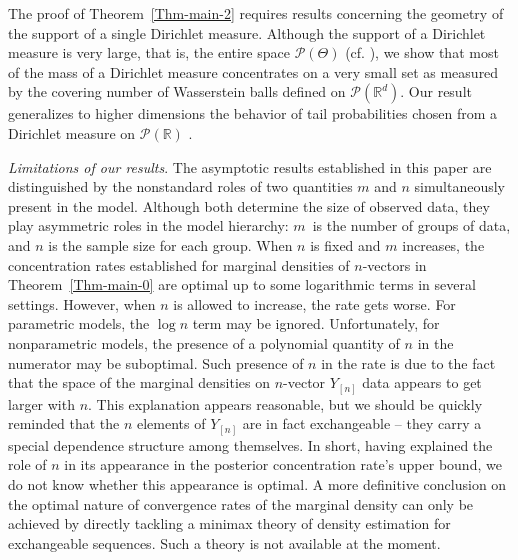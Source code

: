 \documentclass[MSNbibl,number,citesort]{arxbj}
\newcommand{\real}{\mathbb{R}}
\newcommand{\Pcal}{\mathscr{P}}
\newcommand{\YYn}{Y_{[n]}}
\begin{document}
The proof of Theorem~\ref{Thm-main-2} requires results concerning
the geometry of the support of a single Dirichlet measure.
Although the support of a Dirichlet measure is very large, that is,
the entire space $\Pcal(\Theta)$ (cf. \cite{Ferguson}),
we show that most of the mass
of a Dirichlet measure concentrates on a very small set as measured
by the covering number of Wasserstein balls defined on $\Pcal(\real^d)$.
Our result generalizes to higher dimensions
the behavior of tail probabilities chosen from
a Dirichlet measure on $\Pcal(\real)$ \cite{Doss-Sellke}.

\textit{Limitations of our results}.
The asymptotic results established in this paper
are distinguished by the nonstandard
roles of two quantities $m$ and $n$ simultaneously present
in the model. Although both determine the size of observed
data, they play asymmetric roles in the model hierarchy:
$m$~is the number of groups of data, and $n$ is the sample
size for each group.
When $n$ is fixed and $m$ increases, the concentration rates established
for marginal densities of $n$-vectors in Theorem~\ref{Thm-main-0}
are optimal up to some logarithmic terms in several settings. However,
when $n$ is allowed to increase, the rate gets worse.
For parametric models, the $\log n$ term
may be ignored. Unfortunately, for nonparametric models, the
presence of a polynomial quantity of $n$ in the numerator
may be suboptimal. Such presence of $n$ in the rate
is due to the fact that
the space of the marginal densities on $n$-vector
$\YYn$ data appears to get larger with $n$. This explanation appears
reasonable, but
we should be quickly reminded that the $n$ elements of $\YYn$ are in
fact exchangeable -- they carry a special dependence structure
among themselves. In short, having explained the role of $n$
in its appearance in the posterior concentration rate's upper bound,
we do not know whether this appearance is optimal. A more definitive
conclusion on the optimal
nature of convergence rates of the marginal density can
only be achieved by directly tackling a minimax theory of
density estimation for exchangeable sequences.
Such a theory is not available at the moment.
\end{document}

